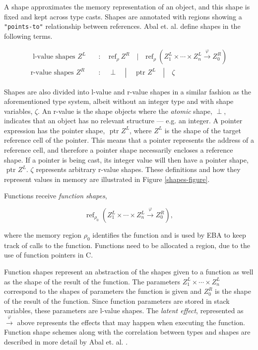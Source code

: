 \newpar A shape approximates the memory representation of an object, and this shape is fixed and kept across type casts. Shapes are annotated with regions showing a \texttt{"points-to"} relationship between references. Abal et. al. define shapes in the following terms. 

\begin{equation*}
\begin{aligned}
    \text { l-value shapes } Z^L \quad &: \quad \text{ref}_{\rho} \:Z^R \quad | \quad \text{ref}_{\rho}\:(Z_1^L \times \cdots \times Z_n^L \stackrel{\varphi}{\rightarrow} Z_0^R)\\
    \text {r-value shapes } Z^R \quad &: \quad \perp \quad | \quad \text { ptr } Z^L \quad | \quad \zeta
\end{aligned}
\end{equation*} 

\noindent Shapes are also divided into l-value and r-value shapes in a similar fashion as the aforementioned type system, albeit without an integer type and with shape variables, $\zeta$. An r-value is the shape objects where the \textit{atomic} shape, $\perp$, indicates that an object has no relevant structure --- e.g. an integer. A pointer expression has the pointer shape, $\text{ ptr } Z^L$, where $Z^L$ is the shape of the target reference cell of the pointer. This means that a pointer represents the address of a reference cell, and therefore a pointer shape necessarily encloses a reference shape. If a pointer is being cast, its integer value will then have a pointer shape, $\text{ ptr } Z^L$. $\zeta$ represents arbitrary r-value shapes. These definitions and how they represent values in memory are illustrated in Figure \ref{shapes-figure}.

\newpar Functions receive \textit{function shapes},

\begin{equation*}
    \operatorname{ref}_{\rho_{0}}\left(Z_{1}^{L} \times \cdots \times Z_{n}^{L} \stackrel{\varphi}{\rightarrow} Z_{0}^{R}\right),
\end{equation*} 

\noindent where the memory region $\rho_0$ identifies the function and is used by EBA to keep track of calls to the function. Functions need to be allocated a region, due to the use of function pointers in C. 

\newpar Function shapes represent an abstraction of the shapes given to a function as well as the shape of the result of the function. The parameters $Z_{1}^{L} \times \cdots \times Z_{n}^{L}$ correspond to the shapes of parameters the function is given and $Z_{0}^{R}$ is the shape of the result of the function. Since function parameters are stored in stack variables, these parameters are l-value shapes. The \textit{latent effect}, represented as $\stackrel{\varphi}{\rightarrow}$ above represents the effects that may happen when executing the function. Function shape schemes along with the correlation between types and shapes are described in more detail by Abal et. al. \cite{Abal2017EffectiveBF}. 

